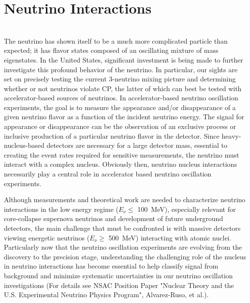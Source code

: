 \section{Neutrino Interactions}
\label{sec:Interactions}

\\The neutrino has shown itself to be a much more complicated particle than expected; it has flavor states composed of an oscillating mixture of mass eigenstates. In the United States, significant investment is being made to further investigate this profound behavior of the neutrino.  In particular, our sights are set on precisely testing the current 3-neutrino mixing picture and determining whether or not neutrinos violate CP, the latter of which can best be tested with accelerator-based sources of neutrinos. In accelerator-based neutrino oscillation experiments, the goal is to measure the appearance and/or disappearance of a given neutrino flavor as a function of the incident neutrino energy.  The signal for appearance or disappearance can be the observation of an exclusive process or inclusive production of a particular neutrino flavor in the detector.  Since heavy-nucleus-based detectors are necessary for a large detector mass, essential to creating the event rates required for sensitive measurements, the neutrino must interact with a complex nucleus.  Obviously then, neutrino nucleus interactions necessarily play a central role in accelerator based neutrino oscillation experiments. 

Although measurements and theoretical work are needed to characterize neutrino interactions in the low energy regime ($E_\nu  \leq$ 100~MeV), especially relevant for core-collapse supernova neutrinos and development of future underground detectors,
the main challenge that must be confronted is with massive detectors viewing energetic neutrinos ($E_\nu  \geq$  500~MeV) interacting with atomic nuclei.  Particularly now that the neutrino oscillation experiments are evolving from the discovery to the precision stage, understanding the challenging role of the nucleus in neutrino interactions has become essential to help classify signal from background and minimize systematic uncertainties in our neutrino oscillation investigations (For details see NSAC Position Paper "Nuclear Theory and the U.S. Experimental Neutrino Physics Program", Alvarez-Ruso, et al.).    
 
